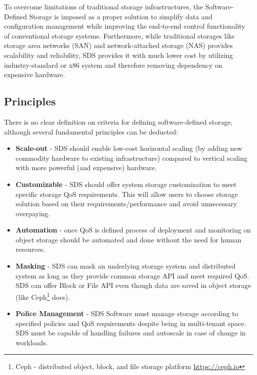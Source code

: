     To overcome limitations of traditional storage infrastructures, the Software-Defined Storage is imposed as a proper solution to simplify data and configuration management while improving the end-to-end control functionality of conventional storage systems\cite{sdsSurvey}. Furthermore, while traditional storages like storage area networks (SAN) and network-attached storage (NAS) provides scalability and reliability, SDS provides it with much lower cost by utilizing industry-standard or x86 system and therefore removing dependency on expensive hardware\cite{sdsWPRedHatSDS}.

    \subsection*{Principles}
    There is no clear definition on criteria for defining software-defined storage, although several fundamental principles can be deducted\cite{sdsGPCloudStorage}:
    \begin{itemize}
        \item \textbf{Scale-out} - SDS should enable low-cost horizontal scaling (by adding new commodity hardware to existing infrastructure) compared to vertical scaling with more powerful (and expensive) hardware.
        \item \textbf{Customizable} - SDS should offer system storage customization to meet specific storage QoS requirements. This will allow users to choose storage solution based on their requirements/performance and avoid unnecessary overpaying.
        \item \textbf{Automation} - once QoS is defined process of deployment and monitoring on object storage should be automated and done without the need for human resources.
        \item \textbf{Masking} - SDS can mask an underlying storage system and distributed system as long as they provide common storage API and meet required QoS. SDS can offer Block or File API even though data are saved in object storage (like Ceph\footnote{Ceph - distributed object, block, and file storage platform {\url{https://ceph.io}}} does).
        \item \textbf{Police Management} - SDS Software must manage storage according to specified policies and QoS requirements despite being in multi-tenant space. SDS must be capable of handling failures and autoscale in case of change in workloads.
    \end{itemize}


